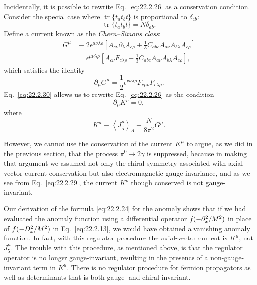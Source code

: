Incidentally, it is possible to rewrite Eq.~\eqref{eq:22.2.26} as a
conservation condition. Consider the special case where
$\operatorname{tr}\{t_a t_b t\}$ is proportional to
$\delta_{ab}$:
\begin{equation}
 \operatorname{tr}\{t_a t_b t\}=N\delta_{ab}.
 \tag{22.2.28}\label{eq:22.2.28}
\end{equation}
Define a current known as the \emph{Chern--Simons class}:
\begin{equation}
 \begin{aligned}
 G^\mu
 &\equiv2\epsilon^{\mu\nu\lambda\rho}
 \left[
 A_{c\nu}\partial_\lambda A_{c\rho}
 +\frac13C_{abc}
 A_{a\nu}A_{b\lambda}A_{c\rho}
 \right]\\
 &=\epsilon^{\mu\nu\lambda\rho}
 \left[
 A_{c\nu}F_{c\lambda\rho}
 -\frac13C_{abc}
 A_{a\nu}A_{b\lambda}A_{c\rho}
 \right],
 \end{aligned}
 \tag{22.2.29}\label{eq:22.2.29}
\end{equation}
which satisfies the identity
\begin{equation}
 \partial_\mu G^\mu
 =\frac12\epsilon^{\mu\nu\lambda\rho}
 F_{c\mu\nu}F_{c\lambda\rho}.
 \tag{22.2.30}\label{eq:22.2.30}
\end{equation}
Eq.~\eqref{eq:22.2.30} allows us to rewrite Eq.~\eqref{eq:22.2.26} as the
condition
\begin{equation}
 \partial_\mu K^\mu=0,
 \tag{22.2.31}\label{eq:22.2.31}
\end{equation}
where
\begin{equation}
 K^\mu\equiv\left\langle J_5^\mu\right\rangle_A
 +\frac{N}{8\pi^2}G^\mu.
 \tag{22.2.32}\label{eq:22.2.32}
\end{equation}

However, we cannot use the conservation of the current $K^\mu$ to argue,
as we did in the previous section, that the process $\pi^0\to2\gamma$ is
suppressed, because in making that argument we assumed not only the chiral
symmetry associated with axial-vector current conservation but also
electromagnetic gauge invariance, and as we see from
Eq.~\eqref{eq:22.2.29}, the current $K^\mu$ though conserved is not
gauge-invariant.

Our derivation of the formula \eqref{eq:22.2.24} for the anomaly shows that
if we had evaluated the anomaly function using a differential operator
$f(-\sl{\partial}_x^2/M^2)$ in place of $f(-\sl{D}_x^2/M^2)$ in
Eq.~\eqref{eq:22.2.13}, we would have obtained a vanishing anomaly
function. In fact, with this regulator procedure the axial-vector current
is $K^\mu$, not $J_5^\mu$. The trouble with this procedure, as mentioned
above, is that the regulator operator is no longer gauge-invariant,
resulting in the presence of a non-gauge-invariant term in $K^\mu$. There
is no regulator procedure for fermion propagators as well as determinants
that is both gauge- and chiral-invariant.

